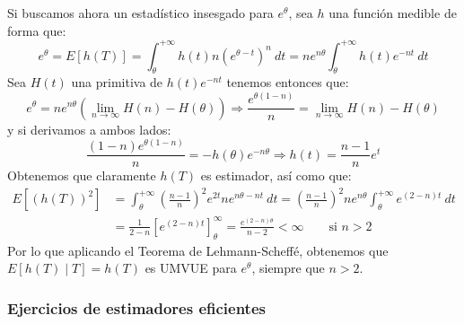 \begin{ejercicio}
    Si buscamos ahora un estadístico insesgado para $e^\theta$, sea $h$ una función medible de forma que:
    \begin{equation*}
        e^\theta = E[h(T)] = \int_{\theta}^{+\infty} h(t)n{(e^{\theta-t})}^{n}~dt = ne^{n\theta}\int_{\theta}^{+\infty}h(t)e^{-nt} ~dt
    \end{equation*}
    Sea $H(t)$ una primitiva de $h(t)e^{-nt}$ tenemos entonces que:
    \begin{equation*}
        e^\theta = ne^{n\theta} \left(\lim_{n\to\infty}H(n)-H(\theta) \right) \Longrightarrow \frac{e^{\theta(1-n)}}{n}=\lim_{n\to\infty}H(n)-H(\theta) 
    \end{equation*}
    y si derivamos a ambos lados:
    \begin{equation*}
        \frac{(1-n)e^{\theta(1-n)}}{n} = -h(\theta) e^{-n\theta} \Longrightarrow h(t) = \frac{n-1}{n}e^t
    \end{equation*}
    Obtenemos que claramente $h(T)$ es estimador, así como que:
    \begin{align*}
        E[{(h(T))}^{2}] &= \int_{\theta}^{+\infty} {\left(\frac{n-1}{n}\right)}^{2} e^{2t}ne^{n\theta-nt}~dt  = {\left(\frac{n-1}{n}\right)}^{2}ne^{n\theta} \int_{\theta}^{+\infty} e^{(2-n)t}~dt  \\
                        &= \frac{1}{2-n}\left[e^{(2-n)t}\right]_\theta^\infty = \frac{e^{(2-n)\theta}}{n-2} < \infty \qquad \text{si\ } n>2
    \end{align*}
    Por lo que aplicando el Teorema de Lehmann-Scheffé, obtenemos que $E[h(T)\mid T] = h(T)$ es UMVUE para $e^{\theta}$, siempre que $n>2$.
\end{ejercicio}

\subsubsection{Ejercicios de estimadores eficientes}

